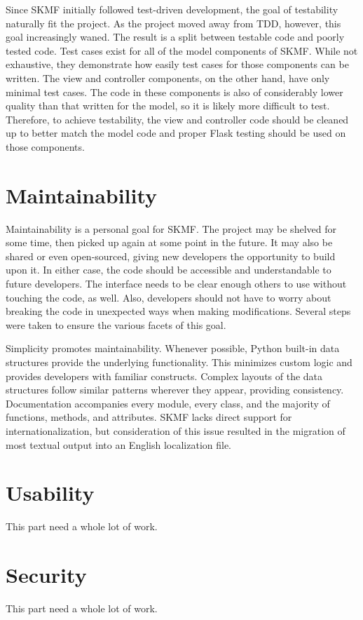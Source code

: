 Since SKMF initially followed test-driven development, the goal of testability naturally fit the project. As the project moved away from TDD, however, this goal increasingly waned. The result is a split between testable code and poorly tested code. Test cases exist for all of the model components of SKMF. While not exhaustive, they demonstrate how easily test cases for those components can be written. The view and controller components, on the other hand, have only minimal test cases. The code in these components is also of considerably lower quality than that written for the model, so it is likely more difficult to test. Therefore, to achieve testability, the view and controller code should be cleaned up to better match the model code and proper Flask testing should be used on those components.


\section{Maintainability}

Maintainability is a personal goal for SKMF. The project may be shelved for some time, then picked up again at some point in the future. It may also be shared or even open-sourced, giving new developers the opportunity to build upon it. In either case, the code should be accessible and understandable to future developers. The interface needs to be clear enough others to use without touching the code, as well. Also, developers should not have to worry about breaking the code in unexpected ways when making modifications. Several steps were taken to ensure the various facets of this goal.

Simplicity promotes maintainability. Whenever possible, Python built-in data structures provide the underlying functionality. This minimizes custom logic and provides developers with familiar constructs. Complex layouts of the data structures follow similar patterns wherever they appear, providing consistency. Documentation accompanies every module, every class, and the majority of functions, methods, and attributes. SKMF lacks direct support for internationalization, but consideration of this issue resulted in the migration of most textual output into an English localization file.


\section{Usability}

This part need a whole lot of work.


\section{Security}

This part need a whole lot of work.
